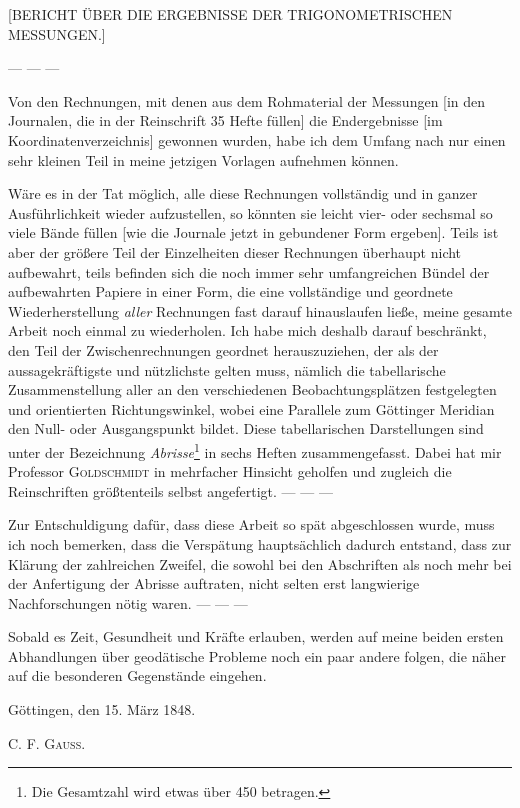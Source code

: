\clearpage
{}%
\begin{center}\large [BERICHT ÜBER DIE ERGEBNISSE DER TRIGONOMETRISCHEN MESSUNGEN.]\end{center}
\par
— — —

Von den Rechnungen, mit denen aus dem Rohmaterial der Messungen [in den Journalen, die in der Reinschrift 35 Hefte füllen] die Endergebnisse [im Koordinatenverzeichnis] gewonnen wurden, habe ich dem Umfang nach nur einen sehr kleinen Teil in meine jetzigen Vorlagen aufnehmen können.

Wäre es in der Tat möglich, alle diese Rechnungen vollständig und in ganzer Ausführlichkeit wieder aufzustellen, so könnten sie leicht vier- oder sechsmal so viele Bände füllen [wie die Journale jetzt in gebundener Form ergeben]. Teils ist aber der größere Teil der Einzelheiten dieser Rechnungen überhaupt nicht aufbewahrt, teils befinden sich die noch immer sehr umfangreichen Bündel der aufbewahrten Papiere in einer Form, die eine vollständige und geordnete Wiederherstellung \textit{aller} Rechnungen fast darauf hinauslaufen ließe, meine gesamte Arbeit noch einmal zu wiederholen. Ich habe mich deshalb darauf beschränkt, den Teil der Zwischenrechnungen geordnet herauszuziehen, der als der aussagekräftigste und nützlichste gelten muss, nämlich die tabellarische Zusammenstellung aller an den verschiedenen Beobachtungsplätzen festgelegten und orientierten Richtungswinkel, wobei eine Parallele zum Göttinger Meridian den Null- oder Ausgangspunkt bildet. Diese tabellarischen Darstellungen sind unter der Bezeichnung \textit{Abrisse}\footnote{Die Gesamtzahl wird etwas über 450 betragen.} in sechs Heften zusammengefasst. Dabei hat mir Professor \textsc{Goldschmidt} in mehrfacher Hinsicht geholfen und zugleich die Reinschriften größtenteils selbst angefertigt. — — —

Zur Entschuldigung dafür, dass diese Arbeit so spät abgeschlossen wurde, muss ich noch bemerken, dass die Verspätung hauptsächlich dadurch entstand, dass zur Klärung der zahlreichen Zweifel, die sowohl bei den Abschriften als noch mehr bei der Anfertigung der Abrisse auftraten, nicht selten erst langwierige Nachforschungen nötig waren. — — —

Sobald es Zeit, Gesundheit und Kräfte erlauben, werden auf meine beiden ersten Abhandlungen über geodätische Probleme noch ein paar andere folgen, die näher auf die besonderen Gegenstände eingehen.

Göttingen, den 15. März 1848.
\begin{flushright}C. F. \textsc{Gauss}.\end{flushright}
